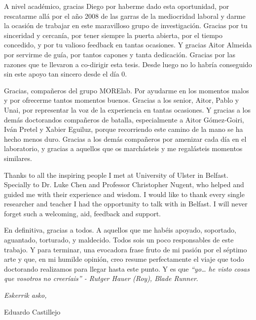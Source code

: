 \begin{acknowledgementslong}
A nivel académico, gracias Diego por haberme dado esta oportunidad, por rescatarme
allá por el año 2008 de las garras de la mediocridad laboral y darme la ocasión
de trabajar en este maravilloso grupo de investigación. Gracias
por tu sinceridad
y cercanía, por tener siempre la puerta abierta, por el tiempo concedido, y por
tu valioso feedback en tantas ocasiones. Y gracias Aitor Almeida por servirme de
guía, por tantos capones y tanta dedicación. Gracias por las razones que te llevaron
a co-dirigir esta tesis. Desde luego no lo habría conseguido sin este apoyo tan
sincero desde el día 0.

Gracias, compañeros del grupo MORElab. Por ayudarme en los momentos malos y por
ofrecerme tantos momentos buenos. Gracias a los senior, Aitor, Pablo y Unai, por
representar la voz de la experiencia en tantas ocasiones. Y gracias a los demás
doctorandos compañeros de batalla, especialmente a Aitor Gómez-Goiri, Iván Pretel
y Xabier Eguiluz, porque recorriendo este camino de la mano se ha hecho menos 
duro. Gracias a los demás compañeros por amenizar cada día en el laboratorio, 
y gracias a aquellos que os marchásteis y me regalásteis momentos similares.

Thanks to all the inspiring people I met at University of Ulster in Belfast.
Specially to Dr. Luke Chen and Professor Christopher Nugent, who helped and
guided me with their experience and wisdom. I would like to thank every single
researcher and teacher I had the opportunity to talk with in Belfast. I will
never forget such a welcoming, aid, feedback and support.

En definitiva, gracias a todos. A aquellos que me habéis apoyado, soportado,
aguantado, torturado, y maldecido. Todos sois un poco responsables de este
trabajo. Y para terminar, una evocadora frase fruto de mi pasión por el séptimo 
arte y que, en mi humilde opinión, creo resume perfectamente el viaje que todo 
doctorando realizamos para llegar hasta este punto. Y es que \textit{``yo\dots 
he visto cosas que vosotros no creeríais'' - Rutger Hauer (Roy), Blade Runner}.


\begin{flushright}
\textit{Eskerrik asko,}

Eduardo Castillejo

\monthname \ \the\year







\end{flushright}



\end{acknowledgementslong}



